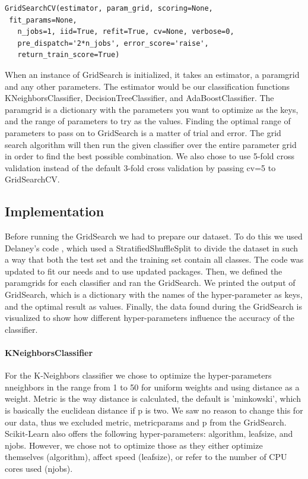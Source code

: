 \documentclass{article}
\begin{document}
		
	\begin{lstlisting}
GridSearchCV(estimator, param_grid, scoring=None,
 fit_params=None, 
   n_jobs=1, iid=True, refit=True, cv=None, verbose=0, 
   pre_dispatch='2*n_jobs', error_score='raise',
   return_train_score=True)
	\end{lstlisting}
		
	When an instance of GridSearch is initialized, it takes an estimator, a param\textunderscore grid and any other parameters. The estimator would be our classification functions KNeighborsClassifier, DecisionTreeClassifier, and AdaBoostClassifier. The param\textunderscore grid is a dictionary with the parameters you want to optimize as the keys, and the range of parameters to try as the values. Finding the optimal range of parameters to pass on to GridSearch is a matter of trial and error. The grid search algorithm will then run the given classifier over the entire parameter grid in order to find the best possible combination. We also chose to use 5-fold cross validation instead of the default 3-fold cross validation by passing cv=5 to GridSearchCV. 

	\subsection{Implementation}
		Before running the GridSearch we had to prepare our dataset. To do this we used Delaney's code \cite{showdown}, which used a StratifiedShuffleSplit to divide the dataset in such a way that both the test set and the training set contain all classes.  The code was updated to fit our needs and to use updated packages. Then, we defined the param\textunderscore grids for each classifier and ran the GridSearch. We printed the output of GridSearch, which is  a dictionary with the names of the hyper-parameter as keys, and the optimal result as values.  Finally, the data found during the GridSearch is visualized to show how different hyper-parameters influence the accuracy of the classifier.
		\paragraph{KNeighborsClassifier}
			For the K-Neighbors classifier we chose to optimize the hyper-parameters n\textunderscore neighbors in the range from 1 to 50 for uniform weights and using distance as a weight. Metric is the way distance is calculated, the default is 'minkowski', which is basically the euclidean distance if p is two. We saw no reason to change this for our data, thus we excluded metric, metric\textunderscore params and p from the GridSearch. Scikit-Learn also offers the following hyper-parameters: algorithm, leaf\textunderscore size, and n\textunderscore jobs. However, we chose not to optimize those as they either optimize themselves (algorithm), affect speed (leaf\textunderscore size), or refer to the number of CPU cores used (n\textunderscore jobs). 
			
\end{document}
